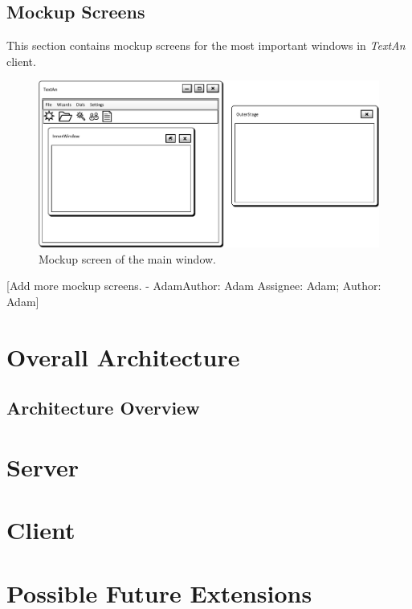 \documentclass[12pt,a4paper]{report}
\makeatletter
\newcommand{\comment}[3][\@empty]{
  {\color{magenta}[#3 - }
  {\color{green}\ifx\@empty#1\relax Author: #2 \else Assignee: #1; Author: #2\fi}{\color{magenta}]}
}
\newcommand{\textan}{\emph{Text\-An}}
\makeatother
\begin{document}
\section{Mockup Screens}
	
This section contains mockup screens for the most important windows in \textan{}
client.

\begin{figure}[!htb]
        \centering
        \includegraphics[width=\textwidth]{Images/MockupMainWindow}
        \caption{Mockup screen of the main window.}
        \label{fig:MockupMainWindow}
\end{figure}

\comment[Adam]{Adam}{Add more mockup screens.}

\chapter{Overall Architecture}
\section{Architecture Overview}


\chapter{Server}


\chapter{Client}


%


\chapter{Possible Future Extensions}

\end{document}
